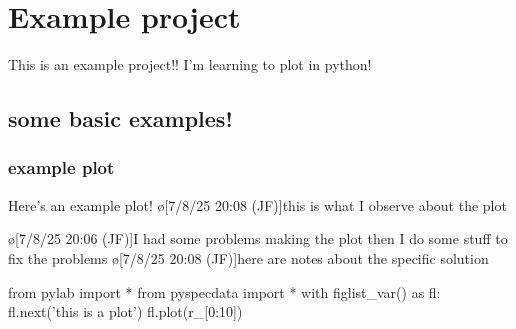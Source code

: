 \section{Example project}
This is an example project!!
I'm learning to plot in python!
\subsection{some basic examples!}
\subsubsection{example plot}\label{sec:examplePlot1}
Here's an example plot!
\o[7/8/25 20:08 (JF)]{this is what I observe about the plot}
\begin{err}
    \o[7/8/25 20:06 (JF)]{I had some problems making the plot}
    then I do some stuff to fix the problems
    \o[7/8/25 20:08 (JF)]{here are notes about the specific solution}
\end{err}
\par
\begin{python}[on]
from pylab import *
from pyspecdata import *
with figlist_var() as fl:
    fl.next('this is a plot')
    fl.plot(r_[0:10])
\end{python}
\par
